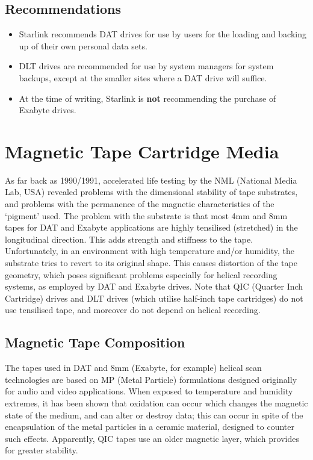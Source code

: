 \subsection {Recommendations}

\begin {itemize}

\item[{\Large\bf +}] Starlink recommends DAT drives for use by users for the
loading and backing up of their own personal data sets.

\item[{\Large\bf +}] DLT drives are recommended for use by system managers for
system backups, except at the smaller sites where a DAT drive will suffice.

\item[{\huge\bf -}] At the time of writing, Starlink is {\bf not} recommending
the purchase of Exabyte drives.

\end {itemize}
\section {Magnetic Tape Cartridge Media}

As far back as 1990/1991, accelerated life testing by the NML (National
Media Lab, USA) revealed problems with the dimensional stability of tape
substrates, and problems with the permanence of the magnetic characteristics
of the `pigment' used. The problem with the substrate is that most 4mm and
8mm tapes for DAT and Exabyte applications are highly tensilised (stretched)
in the longitudinal direction. This adds strength and stiffness to the tape.
Unfortunately, in an environment with high temperature and/or humidity, the
substrate tries to revert to its original shape. This causes distortion of
the tape geometry, which poses significant problems especially for helical
recording systems, as employed by DAT and Exabyte drives. Note that QIC
(Quarter Inch Cartridge) drives and DLT drives (which utilise half-inch
tape cartridges) do not use tensilised tape, and moreover do not depend on
helical recording.

\subsection {Magnetic Tape Composition}

The tapes used in DAT and 8mm (Exabyte, for example) helical scan technologies
are based on MP (Metal Particle) formulations designed originally for audio and
video applications. When exposed to temperature and humidity extremes, it
has been shown that oxidation can occur which changes the magnetic state of the
medium, and can alter or destroy data; this can occur in spite of the
encapsulation of the metal particles in a ceramic material, designed to counter
such effects. Apparently, QIC tapes use an older magnetic layer, which provides
for greater stability.

